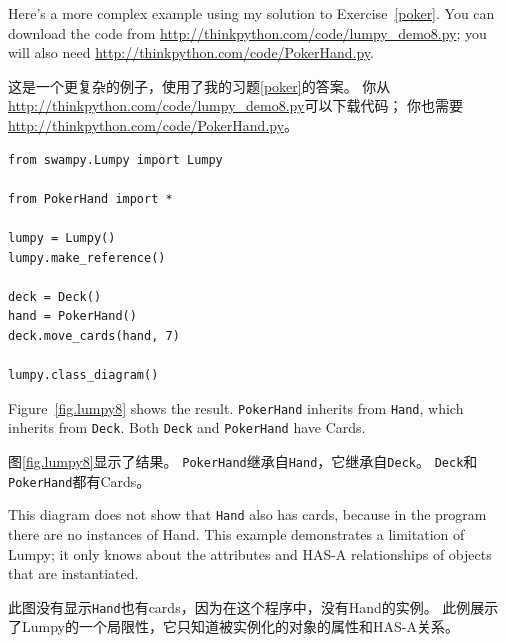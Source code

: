 \documentclass[10pt]{book}
\begin{document}
\begin{CJK}{UTF8}{gbsn}
Here's a more complex example using my solution to Exercise~\ref{poker}.
You can download
the code from \url{http://thinkpython.com/code/lumpy_demo8.py};
you will also need \url{http://thinkpython.com/code/PokerHand.py}.

这是一个更复杂的例子，使用了我的习题\ref{poker}的答案。
你从\url{http://thinkpython.com/code/lumpy_demo8.py}可以下载代码；
你也需要\url{http://thinkpython.com/code/PokerHand.py}。

\begin{verbatim}
from swampy.Lumpy import Lumpy

from PokerHand import *

lumpy = Lumpy()
lumpy.make_reference()

deck = Deck()
hand = PokerHand()
deck.move_cards(hand, 7)

lumpy.class_diagram()
\end{verbatim}

Figure~\ref{fig.lumpy8} shows the result.  
{\tt PokerHand} inherits from {\tt Hand}, which inherits from {\tt Deck}.
Both {\tt Deck} and {\tt PokerHand} have Cards.

图\ref{fig.lumpy8}显示了结果。
{\tt PokerHand}继承自{\tt Hand}，它继承自{\tt Deck}。
{\tt Deck}和{\tt PokerHand}都有Cards。

This diagram does not show that {\tt Hand} also has cards, because
in the program there are no instances of Hand.  This example
demonstrates a limitation of Lumpy; it only knows about the
attributes and HAS-A relationships of objects that are instantiated.

此图没有显示{\tt Hand}也有cards，因为在这个程序中，没有Hand的实例。
此例展示了Lumpy的一个局限性，它只知道被实例化的对象的属性和HAS-A关系。

\printindex

\clearemptydoublepage


\end{CJK}
\end{document}
